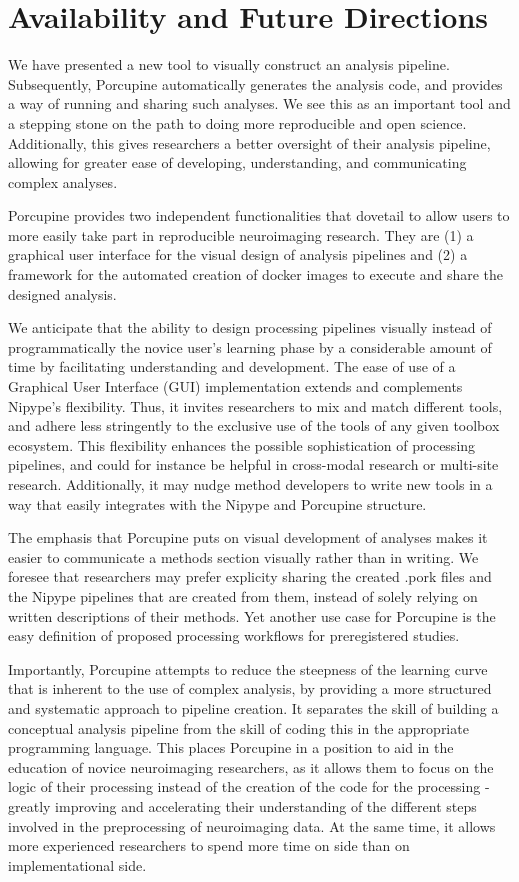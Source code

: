 \section{Availability and Future Directions}
We have presented a new tool to visually construct an analysis pipeline. Subsequently, Porcupine automatically generates the analysis code, and provides a way of running and sharing such analyses. We see this as an important tool and a stepping stone on the path to doing more reproducible and open science. Additionally, this gives researchers a better oversight of their analysis pipeline, allowing for greater ease of developing, understanding, and communicating complex analyses.

Porcupine provides two independent functionalities that dovetail to allow users to more easily take part in reproducible neuroimaging research. They are (1) a graphical user interface for the visual design of analysis pipelines and (2) a framework for the automated creation of docker images to execute and share the designed analysis. 

We anticipate that the ability to design processing pipelines visually instead of programmatically  the novice user's learning phase by a considerable amount of time by facilitating understanding and development. The ease of use of a Graphical User Interface (GUI) implementation extends and complements Nipype's flexibility. Thus, it invites researchers to mix and match different tools, and adhere less stringently to the exclusive use of the tools of any given toolbox ecosystem. This flexibility enhances the possible sophistication of processing pipelines, and could for instance be helpful in cross-modal research or multi-site research. Additionally, it may nudge method developers to write new tools in a way that easily integrates with the Nipype and Porcupine structure.

The emphasis that Porcupine puts on visual development of analyses makes it easier to communicate a methods section visually rather than in writing. We foresee that researchers may prefer explicity sharing the created .pork files and the Nipype pipelines that are created from them, instead of solely relying on written descriptions of their methods. Yet another use case for Porcupine is the easy definition of proposed processing workflows for preregistered studies.

Importantly, Porcupine attempts to reduce the steepness of the learning curve that is inherent to the use of complex analysis, by providing a more structured and systematic approach to pipeline creation. It separates the skill of building a conceptual analysis pipeline from the skill of coding this in the appropriate programming language. This places Porcupine in a position to aid in the education of novice neuroimaging researchers, as it allows them to focus on the logic of their processing instead of the creation of the code for the processing - greatly improving and accelerating their understanding of the different steps involved in the preprocessing of neuroimaging data. At the same time, it allows more experienced researchers to spend more time on  side than on implementational side.

